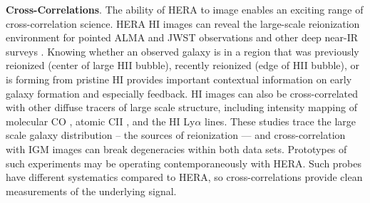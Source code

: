 \documentclass[preprint]{aastex}
\newcommand{\compress}{\vspace{-0.3in}}
\begin{document}



{\bf Cross-Correlations}. The ability of HERA to image enables an exciting range of cross-correlation science.
HERA HI images can reveal the large-scale reionization environment for pointed ALMA and JWST
observations and other deep near-IR surveys \citep{lidz_et_al2009}.
Knowing whether an observed galaxy is in a region that  was
previously reionized (center of large HII bubble), recently reionized (edge of HII bubble), or is forming from
pristine HI provides important contextual information on early galaxy formation and especially feedback.
HI images can also be cross-correlated with other diffuse
tracers of large scale structure, including intensity
mapping of molecular  CO \citep{lidz_et_al2011}, atomic CII \citep{gong_et_al2011}, and the HI Ly$\alpha$ \citep{silva_et_al2013} lines. These studies
trace the large scale galaxy distribution -- the sources of reionization — and cross-correlation 
with IGM images can break degeneracies within both data sets. Prototypes of such experiments
may be operating contemporaneously with HERA. Such probes have different systematics
compared to HERA, so cross-correlations provide clean measurements of the underlying signal.

\end{document}
